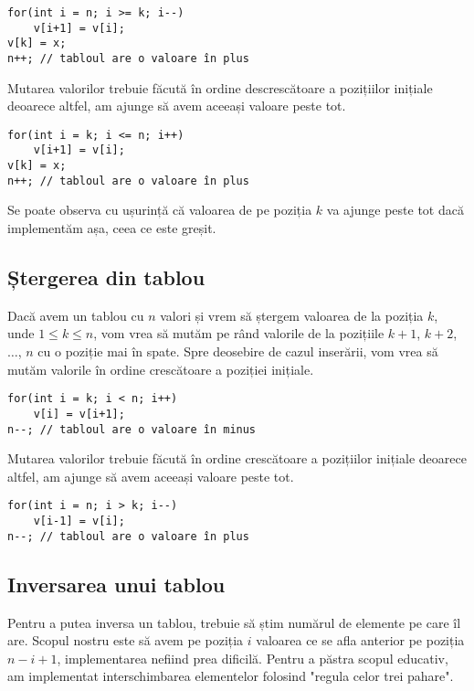 \begin{verbatim}
for(int i = n; i >= k; i--) 
    v[i+1] = v[i];
v[k] = x;
n++; // tabloul are o valoare în plus
\end{verbatim}

\begin{observation}
Mutarea valorilor trebuie făcută în ordine descrescătoare a pozițiilor inițiale deoarece altfel, am ajunge să avem aceeași valoare peste tot.
\end{observation}

\begin{verbatim}
for(int i = k; i <= n; i++) 
    v[i+1] = v[i];
v[k] = x;
n++; // tabloul are o valoare în plus
\end{verbatim}

Se poate observa cu ușurință că valoarea de pe poziția $k$ va ajunge peste tot dacă implementăm așa, ceea ce este greșit.

\subsection{Ștergerea din tablou}

Dacă avem un tablou cu $n$ valori și vrem să ștergem valoarea de la poziția $k$, unde $1 \leq k \leq n$, vom vrea să mutăm pe rând valorile de la pozițiile $k+1$, $k+2$, $\dots$, $n$ cu o poziție mai în spate. Spre deosebire de cazul inserării, vom vrea să mutăm valorile în ordine crescătoare a poziției inițiale. 

\begin{verbatim}
for(int i = k; i < n; i++) 
    v[i] = v[i+1];
n--; // tabloul are o valoare în minus
\end{verbatim}

\begin{observation}
Mutarea valorilor trebuie făcută în ordine crescătoare a pozițiilor inițiale deoarece altfel, am ajunge să avem aceeași valoare peste tot.
\end{observation}

\begin{verbatim}
for(int i = n; i > k; i--) 
    v[i-1] = v[i];
n--; // tabloul are o valoare în plus
\end{verbatim}

\subsection{Inversarea unui tablou}

Pentru a putea inversa un tablou, trebuie să știm numărul de elemente pe care îl are. Scopul nostru este să avem pe poziția $i$ valoarea ce se afla anterior pe poziția $n - i + 1$, implementarea nefiind prea dificilă. Pentru a păstra scopul educativ, am implementat interschimbarea elementelor folosind "regula celor trei pahare".

